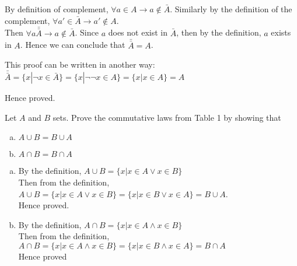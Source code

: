 \documentclass[addpoints]{exam}
\newenvironment{problem}[2][Problem]{\begin{trivlist}
\item[\hskip \labelsep {\bfseries #1}\hskip \labelsep {\bfseries #2.}]}{\end{trivlist}}
\begin{document}
\begin{sloppypar}
\begin{questions}
\begin{solution}
            By definition of complement, $ \forall a \in A \rightarrow a \notin \bar{A} $. Similarly by the definition of the complement, $ \forall a' \in \bar{A} \rightarrow a' \notin A $. \\ 
            Then $ \forall a \bar{\bar{A}} \rightarrow a \notin \bar{A}$. Since $a$ does not exist in $\bar{A}$, then by the definition, $a$ exists in $A$. Hence we can conclude that $ \bar{\bar{A}} = A $. 

            This proof can be written in another way: \\ 
            $ \bar{\bar{A}} = \{ x | \neg x \in \bar{A} \} = \{ x | \neg \neg x \in A \} = \{ x | x \in A \} = A $ 

            Hence proved.
        \end{solution}
    \end{questions}
    \pagebreak
    \begin{problem}{11}[Chapter 2.2, Question 11]
    Let $A$ and $B$ sets. Prove the commutative laws from Table 1 by showing that
    \begin{enumerate}[(a)]
        \item $A \cup B = B \cup A$
        \item $A \cap B = B \cap A$
    \end{enumerate}
    \end{problem}

    \begin{questions}
        \question
        \begin{solution}
            
            \begin{enumerate}[(a)]
                \item By the definition, $ A \cup B = \{x | x \in A \lor x \in B \}  $ \\ Then from the definition, \\ $ A \cup B = \{ x | x \in A \lor x \in B \} = \{ x | x \in B \lor x \in A \} = B \cup A $. \\ Hence proved.
                \item By the definition, $ A \cap B = \{ x | x \in A \land x \in B \} $ \\ Then from the definition, \\ $ A \cap B = \{ x | x \in A \land x \in B \} = \{ x | x \in B \land x \in A \} = B \cap A $ \\ Hence proved
            \end{enumerate}
        \end{solution}
    \end{questions}


\end{sloppypar}
\end{document}
